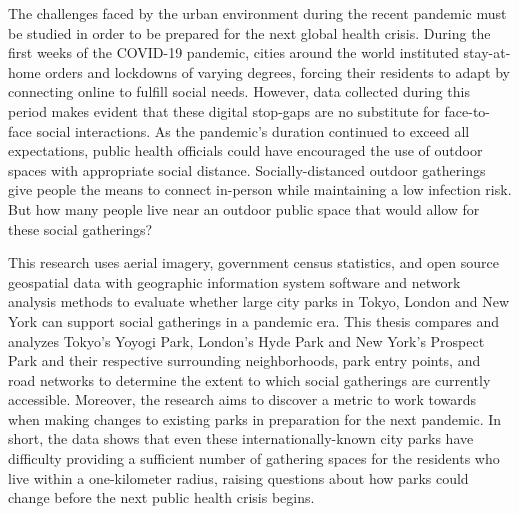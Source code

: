 \noindent The challenges faced by the urban environment during the recent pandemic must be studied in order to be prepared for the next global health crisis. During the first weeks of the COVID-19 pandemic, cities around the world instituted stay-at-home orders and lockdowns of varying degrees, forcing their residents to adapt by connecting online to fulfill social needs. However, data collected during this period makes evident that these digital stop-gaps are no substitute for face-to-face social interactions. As the pandemic’s duration continued to exceed all expectations, public health officials could have encouraged the use of outdoor spaces with appropriate social distance. Socially-distanced outdoor gatherings give people the means to connect in-person while maintaining a low infection risk. But how many people live near an outdoor public space that would allow for these social gatherings?

\noindent This research uses aerial imagery, government census statistics, and open source geospatial data with geographic information system software and network analysis methods to evaluate whether large city parks in Tokyo, London and New York can support social gatherings in a pandemic era. This thesis compares and analyzes Tokyo’s Yoyogi Park, London’s Hyde Park and New York’s Prospect Park and their respective surrounding neighborhoods, park entry points, and road networks to determine the extent to which social gatherings are currently accessible. Moreover, the research aims to discover a metric to work towards when making changes to existing parks in preparation for the next pandemic. In short, the data shows that even these internationally-known city parks have difficulty providing a sufficient number of gathering spaces for the residents who live within a one-kilometer radius, raising questions about how parks could change before the next public health crisis begins.








